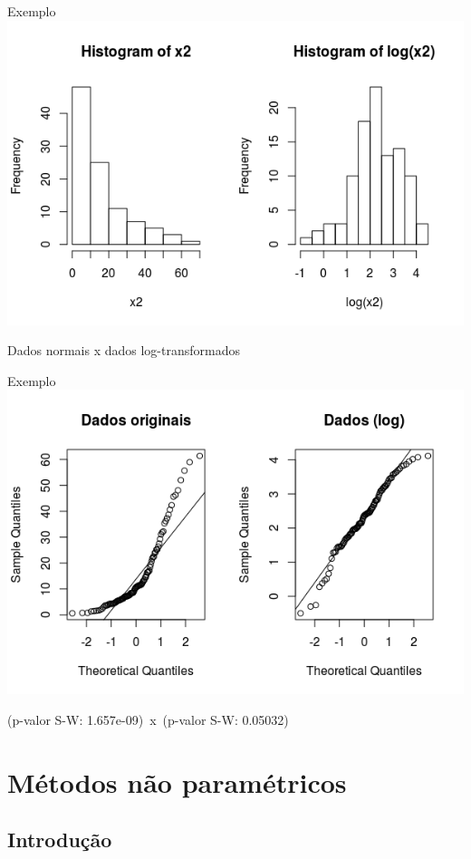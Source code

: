 \documentclass{beamer}
\begin{document}
\begin{frame}{Exemplo}
  \centering
  \includegraphics[width=\textwidth]{Cap37-38/transf-h}

  \footnotesize
Dados normais x dados log-transformados
\end{frame}

\begin{frame}{Exemplo}
  \centering
  \includegraphics[width=\textwidth]{Cap37-38/transf-qq}

  \footnotesize
(p-valor S-W: 1.657e-09)\ x\ (p-valor S-W: 0.05032)
\end{frame}

\section{Métodos não paramétricos}

\subsection[Intro]{Introdução}
\end{document}
